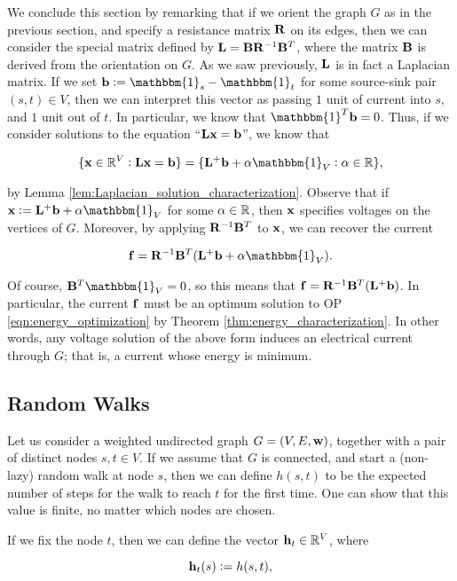 \documentclass[11pt]{article}
\begin{document}
We conclude this section by remarking that if we orient the graph $G$
as in the previous section, and specify a resistance matrix $\V{R}$ on its edges,
then we can consider the special matrix defined by $\V{L} = \V{B}\V{R}^{-1}\V{B}^{T}$,
where the matrix $\V{B}$ is derived from the orientation on $G$. As we saw previously, $\V{L}$ is in fact a Laplacian matrix.
If we set $\V{b}:= \mathbbm{1}_{s} - \mathbbm{1}_{t}$ for some source-sink pair $(s,t) \in V$, then we can interpret
this vector as passing $1$ unit of current into $s$, and $1$ unit out of $t$. In particular, we know that $\mathbbm{1}^{T} \V{b}=0$.
Thus, if we consider solutions to the equation ``$\V{Lx}=\V{b}$'', we know that 

\[
	\{ \V{x} \in \rea^{V}: \V{Lx}=\V{b}\} = \{\V{L}^{+}\V{b}+ \alpha \mathbbm{1}_{V}: \alpha \in \rea\},
\]

by Lemma \ref{lem:Laplacian_solution_characterization}. Observe that if $\V{x} := \V{L}^{+}\V{b}+ \alpha \mathbbm{1}_{V}$
for some $\alpha \in \mathbb R$, then $\V{x}$ specifies voltages on the vertices of $G$. Moreover, by applying $\V{R}^{-1}\V{B}^{T}$
to $\V{x}$, we can recover the current 

\[
	\V{f} = \V{R}^{-1}\V{B}^{T}(\V{L}^{+}\V{b}+ \alpha \mathbbm{1}_{V}).
\]

Of course, $\V{B}^{T}\mathbbm{1}_{V}=0$, so this means that $\V{f}=\V{R}^{-1}\V{B}^{T}(\V{L}^{+}\V{b})$. 
In particular, the current $\V{f}$ must be an optimum solution to OP \ref{eqn:energy_optimization} by Theorem
\ref{thm:energy_characterization}. In other words, any voltage solution of the above form induces an electrical current
through $G$; that is, a current whose energy is minimum.

\subsection{Random Walks}

Let us consider a weighted undirected graph $G=(V,E,\V{w})$, together with a pair of distinct
nodes $s,t \in V$. If we assume that $G$ is connected, and start a (non-lazy) random walk
at node $s$, then we can define $h(s,t)$ to be the expected number of steps
for the walk to reach $t$ for the first time. One can show that this value is finite,
no matter which nodes are chosen.

If we fix the node $t$, then we can define the vector $\V{h}_{t} \in \rea^{V}$,
where

\[
	\V{h}_{t}(s):=h(s,t),
\]
\end{document}
